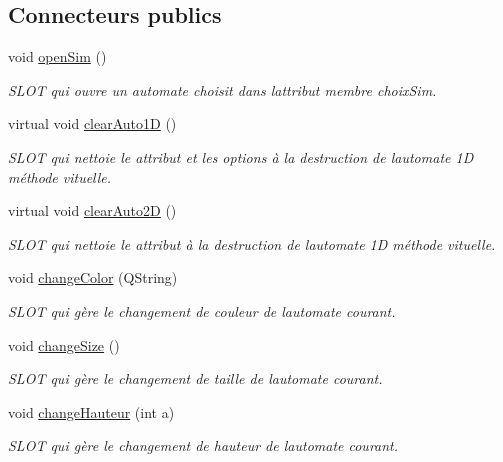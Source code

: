 \subsection*{Connecteurs publics}
\begin{DoxyCompactItemize}
\item 
void \hyperlink{class_main_window_a13e1e518cda3c3ef508f319e5230a425}{open\+Sim} ()
\begin{DoxyCompactList}\small\item\em S\+L\+OT qui ouvre un automate choisit dans l\textquotesingle{}attribut membre choix\+Sim. \end{DoxyCompactList}\item 
virtual void \hyperlink{class_main_window_a990d78b7f127395e17c2772d751052aa}{clear\+Auto1D} ()
\begin{DoxyCompactList}\small\item\em S\+L\+OT qui nettoie le attribut et les options à la destruction de l\textquotesingle{}automate 1D méthode vituelle. \end{DoxyCompactList}\item 
virtual void \hyperlink{class_main_window_a57bb2b74f849477d2033ea02c95d85fc}{clear\+Auto2D} ()
\begin{DoxyCompactList}\small\item\em S\+L\+OT qui nettoie le attribut à la destruction de l\textquotesingle{}automate 1D méthode vituelle. \end{DoxyCompactList}\item 
void \hyperlink{class_main_window_a709661eaabd6f570a8942f66f7c07738}{change\+Color} (Q\+String)
\begin{DoxyCompactList}\small\item\em S\+L\+OT qui gère le changement de couleur de l\textquotesingle{}automate courant. \end{DoxyCompactList}\item 
void \hyperlink{class_main_window_a06ce6c068fd97d586543f7cdd535d23a}{change\+Size} ()
\begin{DoxyCompactList}\small\item\em S\+L\+OT qui gère le changement de taille de l\textquotesingle{}automate courant. \end{DoxyCompactList}\item 
void \hyperlink{class_main_window_ac907dba426762ffbf3a7702af0aba74b}{change\+Hauteur} (int a)
\begin{DoxyCompactList}\small\item\em S\+L\+OT qui gère le changement de hauteur de l\textquotesingle{}automate courant. \end{DoxyCompactList}\item 

\end{DoxyCompactItemize}
